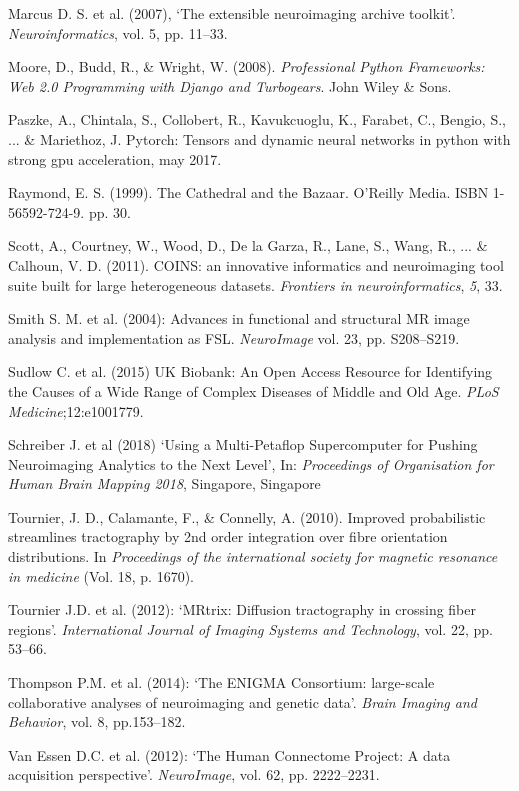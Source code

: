 Marcus D. S. et al. (2007), `The extensible neuroimaging archive
toolkit'. \emph{Neuroinformatics}, vol. 5, pp. 11--33.

Moore, D., Budd, R., \& Wright, W. (2008). \emph{Professional Python
Frameworks: Web 2.0 Programming with Django and Turbogears}. John Wiley
\& Sons.

Paszke, A., Chintala, S., Collobert, R., Kavukcuoglu, K., Farabet, C.,
Bengio, S., ... \& Mariethoz, J. Pytorch: Tensors and dynamic neural
networks in python with strong gpu acceleration, may 2017.

Raymond, E. S. (1999). The Cathedral and the Bazaar. O'Reilly Media.
ISBN 1-56592-724-9. pp. 30.

Scott, A., Courtney, W., Wood, D., De la Garza, R., Lane, S., Wang, R.,
... \& Calhoun, V. D. (2011). COINS: an innovative informatics and
neuroimaging tool suite built for large heterogeneous datasets.
\emph{Frontiers in neuroinformatics}, \emph{5}, 33.

Smith S. M. et al. (2004): Advances in functional and structural MR
image analysis and implementation as FSL. \emph{NeuroImage} vol. 23, pp.
S208--S219.

Sudlow C. et al. (2015) UK Biobank: An Open Access Resource for
Identifying the Causes of a Wide Range of Complex Diseases of Middle and
Old Age. \emph{PLoS Medicine};12:e1001779.

Schreiber J. et al (2018) `Using a Multi-Petaflop Supercomputer for
Pushing Neuroimaging Analytics to the Next Level', In: \emph{Proceedings
of Organisation for Human Brain Mapping 2018}, Singapore, Singapore

Tournier, J. D., Calamante, F., \& Connelly, A. (2010). Improved
probabilistic streamlines tractography by 2nd order integration over
fibre orientation distributions. In \emph{Proceedings of the
international society for magnetic resonance in medicine} (Vol. 18, p.
1670).

Tournier J.D. et al. (2012): `MRtrix: Diffusion tractography in crossing
fiber regions'. \emph{International Journal of Imaging Systems and
Technology}, vol. 22, pp. 53--66.

Thompson P.M. et al. (2014): `The ENIGMA Consortium: large-scale
collaborative analyses of neuroimaging and genetic data'. \emph{Brain
Imaging and Behavior}, vol. 8, pp.153--182.

Van Essen D.C. et al. (2012): `The Human Connectome Project: A data
acquisition perspective'. \emph{NeuroImage}, vol. 62, pp. 2222--2231.

